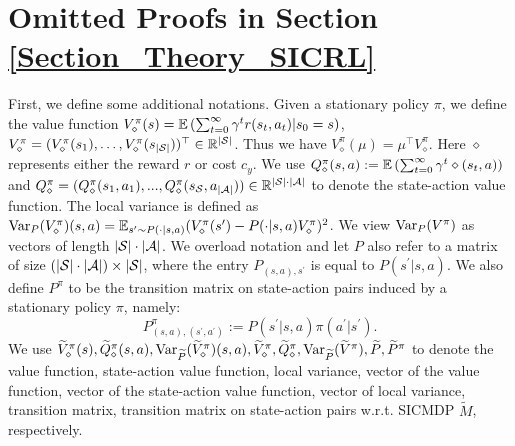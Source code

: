 \section{Omitted Proofs in Section \ref{Section_Theory_SICRL}}
\label{Appendix_Proofs_SICRL}
First, we define some additional notations. 
Given a stationary policy $\pi$, we define the value function $V_\diamond^\pi(s)={\mathbb E}\left({\sum_{t=0}^\infty \gamma^t r(s_t,a_t)|s_0=s}\right)$, $V_\diamond^\pi=(V_\diamond^\pi(s_1), \ldots, V_\diamond^\pi(s_{|{\mathcal{S}}|}))^\top\in {\mathbb R} ^{|{\mathcal{S}}|}$.
Thus we have $V^\pi_\diamond(\mu)=\mu^\top V_\diamond^\pi$.
Here $\diamond$ represents either the reward $r$ or cost $c_y$.
We use $Q_\diamond^\pi(s,a):={\mathbb E}\left({\sum_{t=0}^\infty \gamma^t \diamond(s_t,a)}\right)$ and $Q_\diamond^\pi=(Q_\diamond^\pi(s_1,a_1),...,Q_\diamond^\pi(s_{{\mathcal{S}}},a_{|{\mathcal{A}}|}))\in{\mathbb R}^{|{\mathcal{S}}|\cdot|{\mathcal{A}}|}$ to denote the state-action value function. 
The local variance is defined as $\mathrm{Var}_P(V_\diamond^\pi)(s,a)={\mathbb E}_{s^\prime\sim P(\cdot|s,a)}(V_\diamond^\pi(s^\prime)-P(\cdot|s,a)V_\diamond^\pi)^2$.
We view $\mathrm{Var}_P(V^\pi)$ as vectors of length $|{\mathcal{S}}|\cdot|{\mathcal{A}}|$. 
We overload notation and let $P$ also refer to a matrix of size $(|{\mathcal{S}}|\cdot |{\mathcal{A}}|)\times |{\mathcal{S}}|$, where the entry $P_{(s, a), s^{\prime}}$ is equal to $P(s^\prime|s,a)$. 
We also define $P^\pi$ to be the transition matrix on state-action pairs induced by a stationary policy $\pi$, namely:
$$P_{(s, a),\left(s^{\prime}, a^{\prime}\right)}^{\pi}:=P\left(s^{\prime}| s, a\right) \pi\left(a^{\prime} |s^{\prime}\right).
$$
We use $\widetilde V_\diamond^{\pi}(s), \widetilde Q_\diamond^\pi(s,a), {\mathrm{Var}_{\widetilde P}}(\widetilde{V}_\diamond^\pi)(s,a), \widetilde V_\diamond^\pi, \widetilde Q_\diamond^\pi,{\mathrm{Var}_{\widetilde P}}(\widetilde{V}^\pi), \widetilde P, \widetilde P^\pi$ to denote the value function, state-action value function, local variance, vector of the value function, vector of the state-action value function, vector of local variance, transition matrix, transition matrix on state-action pairs w.r.t. SICMDP $\widetilde M$, respectively.


